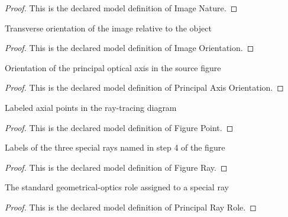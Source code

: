 \begin{proof}
  This is the declared model definition of Image Nature.
\end{proof}
\begin{definition}
  \label{def:physics:phyx-mini-0159:phyxminiproblems-problemphyxmini0159-imageorientation}
  Transverse orientation of the image relative to the object
\end{definition}
\begin{proof}
  This is the declared model definition of Image Orientation.
\end{proof}
\begin{definition}
  \label{def:physics:phyx-mini-0159:phyxminiproblems-problemphyxmini0159-principalaxisorientation}
  Orientation of the principal optical axis in the source figure
\end{definition}
\begin{proof}
  This is the declared model definition of Principal Axis Orientation.
\end{proof}
\begin{definition}
  \label{def:physics:phyx-mini-0159:phyxminiproblems-problemphyxmini0159-figurepoint}
  Labeled axial points in the ray-tracing diagram
\end{definition}
\begin{proof}
  This is the declared model definition of Figure Point.
\end{proof}
\begin{definition}
  \label{def:physics:phyx-mini-0159:phyxminiproblems-problemphyxmini0159-figureray}
  Labels of the three special rays named in step 4 of the figure
\end{definition}
\begin{proof}
  This is the declared model definition of Figure Ray.
\end{proof}
\begin{definition}
  \label{def:physics:phyx-mini-0159:phyxminiproblems-problemphyxmini0159-principalrayrole}
  The standard geometrical-optics role assigned to a special ray
\end{definition}
\begin{proof}
  This is the declared model definition of Principal Ray Role.
\end{proof}
